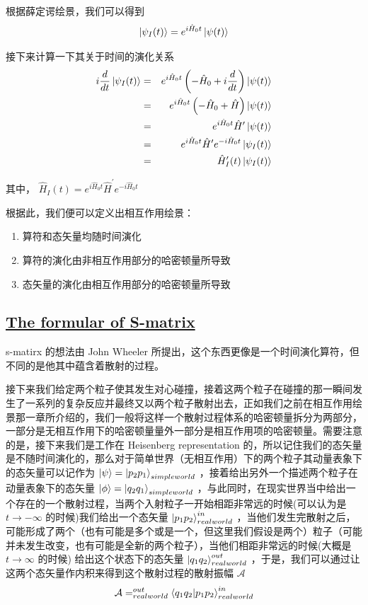 根据薛定谔绘景，我们可以得到
\begin{equation}
    \ket{\psi_I(t)} = e^{i\hat{H}_0 t}\ket{\psi(t)}
\end{equation}

接下来计算一下其关于时间的演化关系
\begin{eqnarray*}
    i\frac{d}{dt} \ket{\psi_I(t)} &=& e^{i\hat{H}_0 t}\left(-\hat{H}_0 + i\frac{d}{dt}\right)\ket{\psi(t)} \\
    &=& e^{i\hat{H}_0 t}\left(-\hat{H}_0 + \hat{H}\right)\ket{\psi(t)} \\
    &=& e^{i\hat{H}_0 t}\hat{H}^\prime\ket{\psi(t)} \\
    &=& e^{i\hat{H}_0 t}\hat{H}^\prime e^{-i\hat{H}_0 t}\ket{\psi_I(t)} \\
    &=& \hat{H}^\prime_I(t)\ket{\psi_I(t)}
\end{eqnarray*}

其中， $ \displaystyle \hat{H}_I(t) = e^{i\hat{H}_0 t}\hat{H}^\prime e^{-i\hat{H}_0 t} $ 

根据此，我们便可以定义出相互作用绘景：
\begin{enumerate}
    \item 算符和态矢量均随时间演化
    \item 算符的演化由非相互作用部分的哈密顿量所导致
    \item 态矢量的演化由相互作用部分的哈密顿量所导致
\end{enumerate}

\subsection{\protect\hyperlink{:}{The formular of S-matrix}}

s-matirx 的想法由 John Wheeler 所提出，这个东西更像是一个时间演化算符，但不同的是他其中蕴含着散射的过程。

接下来我们给定两个粒子使其发生对心碰撞，接着这两个粒子在碰撞的那一瞬间发生了一系列的复杂反应并最终又以两个粒子散射出去，正如我们之前在相互作用绘景那一章所介绍的，我们一般将这样一个散射过程体系的哈密顿量拆分为两部分，一部分是无相互作用下的哈密顿量量外一部分是相互作用项的哈密顿量。需要注意的是，接下来我们是工作在 Heisenberg representation 的，所以记住我们的态矢量是不随时间演化的，那么对于简单世界（无相互作用）下的两个粒子其动量表象下的态矢量可以记作为 $ \ket{\psi} = \ket{p_2p_1}_{simpleworld} $ ，接着给出另外一个描述两个粒子在动量表象下的态矢量 $ \ket{\phi} = \ket{q_2q_1}_{simpleworld} $ ，与此同时，在现实世界当中给出一个存在的一个散射过程，当两个入射粒子一开始相距非常远的时候(可以认为是 $ t\to -\infty $ 的时候)我们给出一个态矢量 $ \ket{p_1p_2}_{realworld}^{in} $ ，当他们发生完散射之后，可能形成了两个（也有可能是多个或是一个，但这里我们假设是两个）粒子（可能并未发生改变，也有可能是全新的两个粒子），当他们相距非常远的时候(大概是 $ t \to \infty $ 的时候) 给出这个状态下的态矢量 $ \ket{q_1q_2}_{realworld}^{out} $ ，于是，我们可以通过让这两个态矢量作内积来得到这个散射过程的散射振幅 $ \mathcal{A} $  
\begin{equation}
    \mathcal{A} = ^{out}_{realworld}\braket{q_1q_2}{p_1p_2}_{realworld}^{in}
\end{equation}

